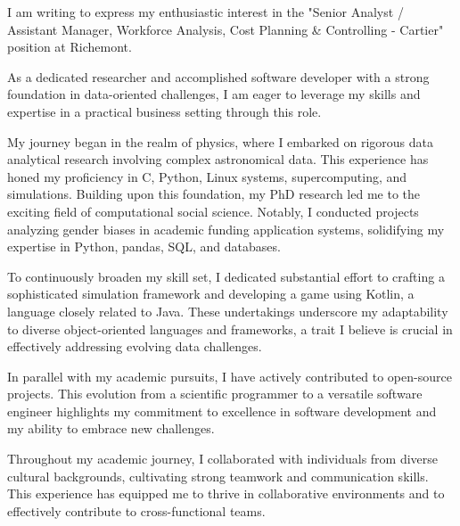 \documentclass[11pt, a4paper]{awesome-cv}
\begin{document}
\makecvheader[R]

\makecvfooter
  {}%
  {}%
  {}

\makelettertitle

\begin{cvletter}

I am writing to express my enthusiastic interest in the "Senior Analyst / Assistant Manager, Workforce Analysis, Cost Planning \& Controlling - Cartier" position at Richemont.


As a dedicated researcher and accomplished software developer with a strong foundation in data-oriented challenges, I am eager to leverage my skills and expertise in a practical business setting through this role.

My journey began in the realm of physics, where I embarked on rigorous data analytical research involving complex astronomical data. This experience has honed my proficiency in C, Python, Linux systems, supercomputing, and simulations. Building upon this foundation, my PhD research led me to the exciting field of computational social science. Notably, I conducted projects analyzing gender biases in academic funding application systems, solidifying my expertise in Python, pandas, SQL, and databases.

To continuously broaden my skill set, I dedicated substantial effort to crafting a sophisticated simulation framework and developing a game using Kotlin, a language closely related to Java. These undertakings underscore my adaptability to diverse object-oriented languages and frameworks, a trait I believe is crucial in effectively addressing evolving data challenges.

In parallel with my academic pursuits, I have actively contributed to open-source projects. This evolution from a scientific programmer to a versatile software engineer highlights my commitment to excellence in software development and my ability to embrace new challenges.

Throughout my academic journey, I collaborated with individuals from diverse cultural backgrounds, cultivating strong teamwork and communication skills. This experience has equipped me to thrive in collaborative environments and to effectively contribute to cross-functional teams.


\end{cvletter}
\end{document}

